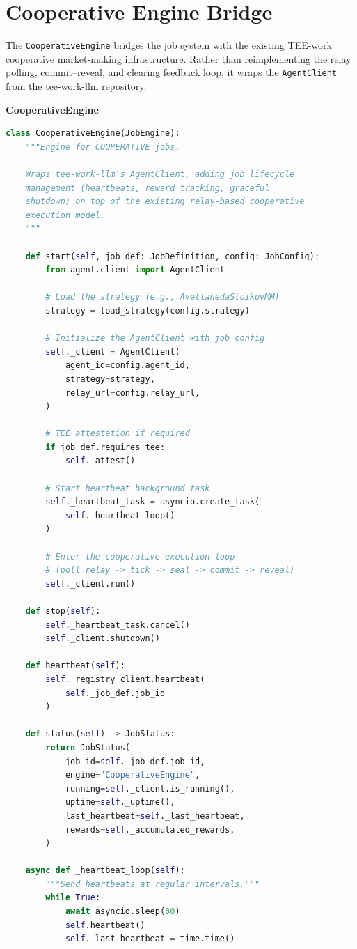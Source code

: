 \documentclass[11pt,a4paper]{article}
\begin{document}
\section{Cooperative Engine Bridge}

The \texttt{CooperativeEngine} bridges the job system with the existing TEE-work
cooperative market-making infrastructure. Rather than reimplementing the relay
polling, commit--reveal, and clearing feedback loop, it wraps the \texttt{AgentClient}
from the tee-work-llm repository.

\begin{contractbox}
\textbf{CooperativeEngine}
\begin{lstlisting}[language=Python]
class CooperativeEngine(JobEngine):
    """Engine for COOPERATIVE jobs.

    Wraps tee-work-llm's AgentClient, adding job lifecycle
    management (heartbeats, reward tracking, graceful
    shutdown) on top of the existing relay-based cooperative
    execution model.
    """

    def start(self, job_def: JobDefinition, config: JobConfig):
        from agent.client import AgentClient

        # Load the strategy (e.g., AvellanedaStoikovMM)
        strategy = load_strategy(config.strategy)

        # Initialize the AgentClient with job config
        self._client = AgentClient(
            agent_id=config.agent_id,
            strategy=strategy,
            relay_url=config.relay_url,
        )

        # TEE attestation if required
        if job_def.requires_tee:
            self._attest()

        # Start heartbeat background task
        self._heartbeat_task = asyncio.create_task(
            self._heartbeat_loop()
        )

        # Enter the cooperative execution loop
        # (poll relay -> tick -> seal -> commit -> reveal)
        self._client.run()

    def stop(self):
        self._heartbeat_task.cancel()
        self._client.shutdown()

    def heartbeat(self):
        self._registry_client.heartbeat(
            self._job_def.job_id
        )

    def status(self) -> JobStatus:
        return JobStatus(
            job_id=self._job_def.job_id,
            engine="CooperativeEngine",
            running=self._client.is_running(),
            uptime=self._uptime(),
            last_heartbeat=self._last_heartbeat,
            rewards=self._accumulated_rewards,
        )

    async def _heartbeat_loop(self):
        """Send heartbeats at regular intervals."""
        while True:
            await asyncio.sleep(30)
            self.heartbeat()
            self._last_heartbeat = time.time()
\end{lstlisting}
\end{contractbox}
\end{document}
